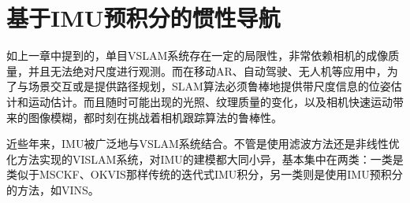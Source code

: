 \chapter{基于IMU预积分的惯性导航}\label{ch:vislam}

如上一章中提到的，单目VSLAM系统存在一定的局限性，非常依赖相机的成像质量，并且无法绝对尺度进行观测\citep{jones2011visual}。而在移动AR、自动驾驶、无人机等应用中，为了与场景交互或是提供路径规划，SLAM算法必须鲁棒地提供带尺度信息的位姿估计和运动估计。而且随时可能出现的光照、纹理质量的变化，以及相机快速运动带来的图像模糊，都时刻在挑战着相机跟踪算法的鲁棒性。

近些年来，IMU被广泛地与VSLAM系统结合。不管是使用滤波方法还是非线性优化方法实现的VISLAM系统，对IMU的建模都大同小异，基本集中在两类：一类是类似于MSCKF\citep{mourikis2007multi}、OKVIS\citep{leutenegger2015keyframe}那样传统的迭代式IMU积分，另一类则是使用IMU预积分\citep{forster2017manifold}的方法，如VINS\citep{li2017monocular}。


